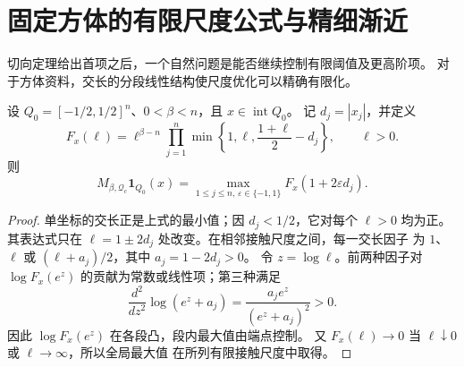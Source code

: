 \section{固定方体的有限尺度公式与精细渐近}
\label{fix:section}

切向定理给出首项之后，一个自然问题是能否继续控制有限阈值及更高阶项。
对于方体资料，交长的分段线性结构使尺度优化可以精确有限化。

\begin{theorem}[内部中心的有限接触尺度公式]\label{fix:finite-scales}
设 $Q_0=[-1/2,1/2]^n$、$0<\beta<n$，且 $x\in\operatorname{int}Q_0$。
记 $d_j=|x_j|$，并定义
\[
 F_x(\ell)=\ell^{\beta-n}\prod_{j=1}^n
 \min\left\{1,\ell,\frac{1+\ell}{2}-d_j\right\},\qquad \ell>0.
\]
则
\begin{equation}\label{fix:contact-formula}
 M_{\beta,\mathcal Q_c}\mathbf1_{Q_0}(x)
 =\max_{1\le j\le n,\,\varepsilon\in\{-1,1\}}
 F_x(1+2\varepsilon d_j).
\end{equation}
\end{theorem}
\begin{proof}
单坐标的交长正是上式的最小值；因 $d_j<1/2$，它对每个 $\ell>0$ 均为正。
其表达式只在 $\ell=1\pm2d_j$ 处改变。在相邻接触尺度之间，每一交长因子
为 $1$、$\ell$ 或 $(\ell+a_j)/2$，其中 $a_j=1-2d_j>0$。
令 $z=\log\ell$。前两种因子对 $\log F_x(e^z)$ 的贡献为常数或线性项；第三种满足
\[
 \frac{d^2}{dz^2}\log(e^z+a_j)
 =\frac{a_je^z}{(e^z+a_j)^2}>0.
\]
因此 $\log F_x(e^z)$ 在各段凸，段内最大值由端点控制。
又 $F_x(\ell)\to0$ 当 $\ell\downarrow0$ 或 $\ell\to\infty$，所以全局最大值
在所列有限接触尺度中取得。
\end{proof}

